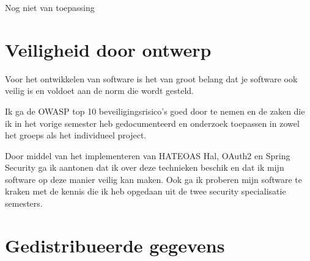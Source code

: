 Nog niet van toepassing




\section{Veiligheid door ontwerp}\label{sec:veiligheid-door-ontwerp}

Voor het ontwikkelen van software is het van groot belang dat je software ook veilig is en voldoet aan de norm die
wordt gesteld.

Ik ga de OWASP top 10 beveiligingsrisico's goed door te nemen en de zaken die ik in het vorige semester heb
gedocumenteerd en onderzoek toepassen in zowel het groeps als het individueel project.

Door middel van het implementeren van HATEOAS Hal, OAuth2 en Spring Security ga ik aantonen dat ik over deze
technieken beschik en dat ik mijn software op deze manier veilig kan maken.
Ook ga ik proberen mijn software te kraken met de kennis die ik heb opgedaan uit de twee security specialisatie
semesters.





\section{Gedistribueerde gegevens}\label{sec:gedistribueerde-gegevens}

